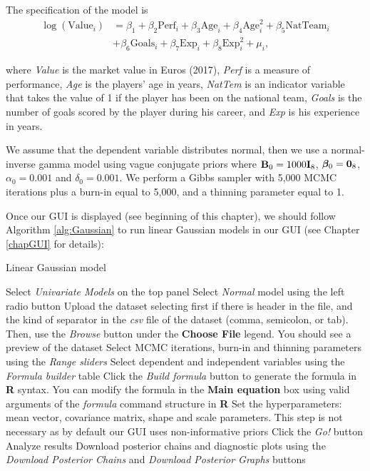 The specification of the model is
\begin{align*}
	\log(\text{Value}_i)&={\beta}_1+{\beta}_2\text{Perf}_i+{\beta}_3\text{Age}_i+{\beta}_4\text{Age}^2_i+{\beta}_5\text{NatTeam}_i\\
	&+{\beta}_6\text{Goals}_i+{\beta}_7\text{Exp}_i+{\beta}_{8}\text{Exp}^2_i+\mu_i,
\end{align*}

where \textit{Value} is the market value in Euros (2017), \textit{Perf} is a measure of performance, \textit{Age} is the players' age in years, \textit{NatTem} is an indicator variable that takes the value of 1 if the player has been on the national team, \textit{Goals} is the number of goals scored by the player during his career, and \textit{Exp} is his experience in years.  

We assume that the dependent variable distributes normal, then we use a normal-inverse gamma model using vague conjugate priors where ${\bf{B}}_0=1000{\bf{I}}_{8}$, $\bm{\beta}_0={\bf{0}}_{8}$, $\alpha_0=0.001$ and $\delta_0=0.001$. We perform a Gibbs sampler with 5,000 MCMC iterations plus a burn-in equal to 5,000, and a thinning parameter equal to 1.

Once our GUI is displayed (see beginning of this chapter), we should follow Algorithm \ref{alg:Gaussian} to run linear Gaussian models in our GUI (see Chapter \ref{chapGUI} for details):
\begin{algorithm}[h!]
	\caption{Linear Gaussian model}\label{alg:Gaussian}
	\begin{algorithmic}[1]  		 			
		\State Select \textit{Univariate Models} on the top panel
		\State Select \textit{Normal} model using the left radio button
		\State Upload the dataset selecting first if there is header in the file, and the kind of separator in the \textit{csv} file of the dataset (comma, semicolon, or tab). Then, use the \textit{Browse} button under the \textbf{Choose File} legend. You should see a preview of the dataset
		\State Select MCMC iterations, burn-in and thinning parameters using the \textit{Range sliders}
		\State Select dependent and independent variables using the \textit{Formula builder} table
		\State Click the \textit{Build formula} button to generate the formula in \textbf{R} syntax. You can modify the formula in the \textbf{Main equation} box using valid arguments of the \textit{formula} command structure in \textbf{R}
		\State Set the hyperparameters: mean vector, covariance matrix, shape and scale parameters. This step is not necessary as by default our GUI uses non-informative priors
		\State Click the \textit{Go!} button
		\State Analyze results
		\State Download posterior chains and diagnostic plots using the \textit{Download Posterior Chains} and \textit{Download Posterior Graphs} buttons
	\end{algorithmic} 
\end{algorithm}

